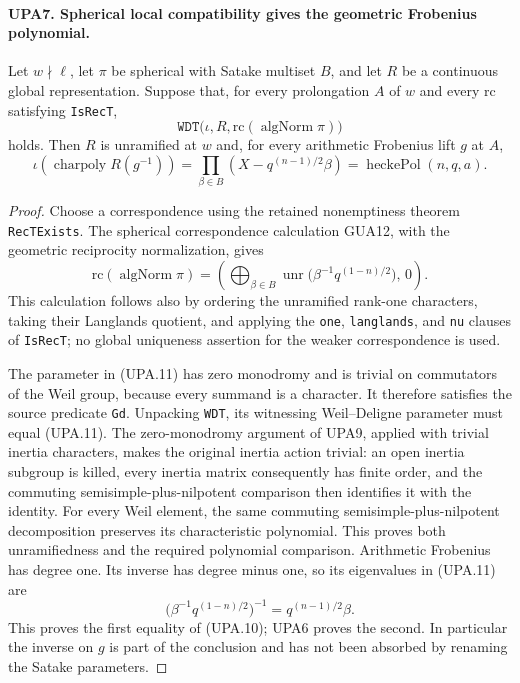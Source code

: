 \paragraph{UPA7. Spherical local compatibility gives the geometric Frobenius polynomial.}
\label{claim:UPA7}
Let $w\nmid\ell$, let $\pi$ be spherical with Satake multiset
$B$, and let $R$ be a continuous global representation.
Suppose that, for every prolongation $A$ of $w$ and every
$\mathrm{rc}$ satisfying \texttt{IsRecT},
\[
 \texttt{WDT}\bigl(\iota,R,\mathrm{rc}(\operatorname{algNorm}\pi)\bigr)
 \tag{UPA.9}
\]
holds.  Then $R$ is unramified at $w$ and, for every
arithmetic Frobenius lift $g$ at $A$,
\[
 \iota\!\left(\operatorname{charpoly}R(g^{-1})\right)
       =\prod_{\beta\in B}(X-q^{(n-1)/2}\beta)
       =\operatorname{heckePol}(n,q,a).
 \tag{UPA.10}
\]
\begin{proof}
Choose a correspondence using the retained nonemptiness theorem
\texttt{RecTExists}.  The spherical correspondence calculation
GUA12, with the geometric reciprocity
normalization, gives
\[
 \mathrm{rc}(\operatorname{algNorm}\pi)
   =\left(\bigoplus_{\beta\in B}\operatorname{unr}
       \bigl(\beta^{-1}q^{(1-n)/2}\bigr),\,0\right).
 \tag{UPA.11}
\]
This calculation follows also by ordering the unramified
rank-one characters, taking their Langlands quotient, and
applying the \texttt{one}, \texttt{langlands}, and
\texttt{nu} clauses of \texttt{IsRecT}; no global uniqueness
assertion for the weaker correspondence is used.

The parameter in (UPA.11) has zero monodromy and is trivial
on commutators of the Weil group, because every summand is
a character.  It therefore satisfies the source predicate
\texttt{Gd}.  Unpacking \texttt{WDT}, its witnessing
Weil--Deligne parameter must equal (UPA.11).
The zero-monodromy argument of UPA9, applied with trivial inertia
characters, makes the original inertia action trivial: an open
inertia subgroup is killed, every inertia matrix consequently has
finite order, and the commuting semisimple-plus-nilpotent comparison
then identifies it with the identity.  For every Weil element, the
same commuting semisimple-plus-nilpotent decomposition preserves
its characteristic polynomial.  This proves both unramifiedness
and the required polynomial comparison.  Arithmetic Frobenius
has degree one.  Its inverse has degree minus one, so its
eigenvalues in (UPA.11) are
\[
       \bigl(\beta^{-1}q^{(1-n)/2}\bigr)^{-1}
                          =q^{(n-1)/2}\beta.
\]
This proves the first equality of (UPA.10); UPA6 proves
the second.  In particular the inverse on $g$ is part of
the conclusion and has not been absorbed by renaming the
Satake parameters.
\end{proof}

